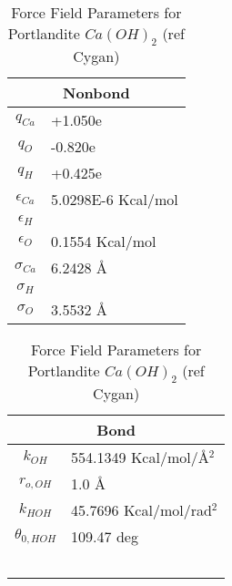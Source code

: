 \documentclass[twoside,english]{uiofysmaster}
\begin{document}
\begin{table}
 \caption{Force Field Parameters for Portlandite $Ca(OH)_2$ (ref Cygan)}
  \begin{tabular}[]{|c|l|}
  \hline
  \multicolumn{2}{|c|}{Nonbond} \\ \hline
  $q_{Ca}$ & +1.050e  \\ \hline
  $q_O$ & -0.820e  \\ \hline
  $q_H$ & +0.425e  \\ \hline

  $\epsilon _{Ca}$ & 5.0298E-6 Kcal/mol \\ \hline
  $\epsilon _H$ &  \\ \hline
  $\epsilon _O$ & 0.1554 Kcal/mol \\ \hline
  $\sigma _{Ca}$ & 6.2428 \AA{} \\ \hline
  $\sigma _H$ &  \\ \hline
  $\sigma _O$ & 3.5532 \AA{} \\ \hline
 \end{tabular}
  \begin{tabular}[]{|c|l|}
  \hline
  \multicolumn{2}{|c|}{Bond} \\ \hline
  $k_{OH}$ & 554.1349 Kcal/mol/\AA{}$^2$  \\ \hline
  $r_{o,OH}$ & 1.0 \AA{}  \\ \hline
  $k_{HOH}$ & 45.7696 Kcal/mol/rad$^2$ \\ \hline
  $\theta _{0,HOH}$ & 109.47 deg \\ \hline
                    &           \\ \hline
                    &           \\ \hline
		    &           \\ \hline
                    &           \\ \hline
                    &           \\ \hline

 \end{tabular}
 \label{ForceFieldParameters_Portlandite}
\end{table}
\end{document}

